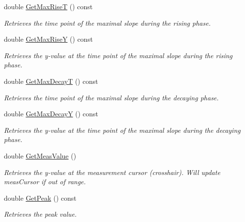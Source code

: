 \begin{DoxyCompactItemize}
double \hyperlink{classRecording_a28cc5ced08658608ffd4d0a562f748ec}{GetMaxRiseT} () const 
\begin{DoxyCompactList}\small\item\em Retrieves the time point of the maximal slope during the rising phase. \item\end{DoxyCompactList}\item 
double \hyperlink{classRecording_a1c15a836ced7baf51fa007ade0274309}{GetMaxRiseY} () const 
\begin{DoxyCompactList}\small\item\em Retrieves the y-\/value at the time point of the maximal slope during the rising phase. \item\end{DoxyCompactList}\item 
double \hyperlink{classRecording_a48be6fe2246e3b6d05c1afde144cee7e}{GetMaxDecayT} () const 
\begin{DoxyCompactList}\small\item\em Retrieves the time point of the maximal slope during the decaying phase. \item\end{DoxyCompactList}\item 
double \hyperlink{classRecording_ad50ae196f6f57496eddfde31746d66d2}{GetMaxDecayY} () const 
\begin{DoxyCompactList}\small\item\em Retrieves the y-\/value at the time point of the maximal slope during the decaying phase. \item\end{DoxyCompactList}\item 
double \hyperlink{classRecording_a9864faad555a8045d63a8b7eb1d48a4d}{GetMeasValue} ()
\begin{DoxyCompactList}\small\item\em Retrieves the y-\/value at the measurement cursor (crosshair). Will update measCursor if out of range. \item\end{DoxyCompactList}\item 
double \hyperlink{classRecording_aac9e484d34cd41ee08d03e7d9dffbfc1}{GetPeak} () const 
\begin{DoxyCompactList}\small\item\em Retrieves the peak value. \item\end{DoxyCompactList}\item 

\end{DoxyCompactItemize}
